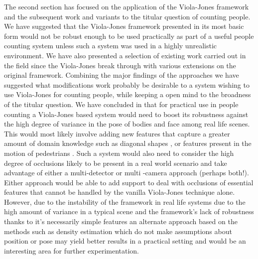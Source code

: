 \documentclass[conference]{IEEEtran}
\begin{document}
The second section has focused on the application of the Viola-Jones framework and the subsequent work and variants to the titular question of counting people. We have suggested that the Viola-Jones framework presented in its most basic form would not be robust enough to be used practically as part of a useful people counting system unless such a system was used in a highly unrealistic environment. We have also presented a selection of existing work carried out in the field since the Viola-Jones break through with various extensions on the original framework. Combining the major findings of the approaches we have suggested what modifications work probably be desirable to a system wishing to use Viola-Jones for counting people, while keeping a open mind to the broadness of the titular question. We have concluded in that for practical use in people counting a Viola-Jones based system would need to boost its robustness against the high degree of variance in the pose of bodies and face among real life scenes. This would most likely involve adding new features that capture a greater amount of domain knowledge such as diagonal shapes \cite{lienhart2002extended}, or features present in the motion of pedestrians \cite{viola2003detecting}. Such a system would also need to consider the high degree of occlusions likely to be present in a real world scenario and take advantage of either a multi-detector or multi -camera approach (perhaps both!). Either approach would be able to add support to deal with occlusions of essential features that cannot be handled by the vanilla Viola-Jones technique alone. However, due to the instability of the framework in real life systems due to the high amount of variance in a typical scene and the framework's lack of robustness thanks to it's necessarily simple features an alternate approach based on the methods such as density estimation which do not make assumptions about position or pose may yield better results in a practical setting and would be an interesting area for further experimentation.
\end{document}
